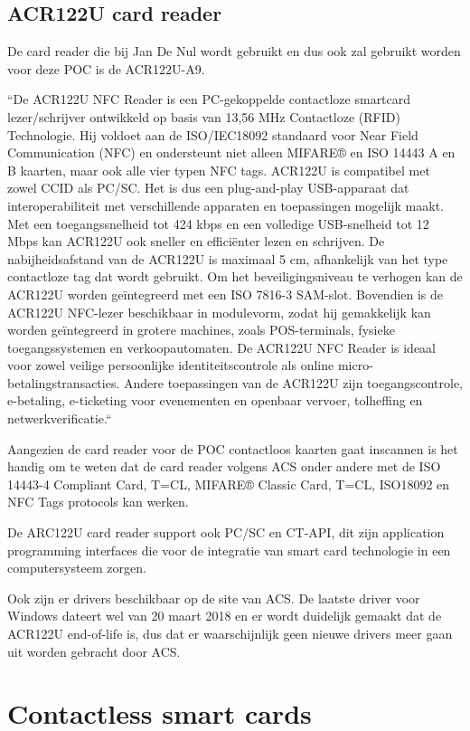 \subsection{ACR122U card reader}
De card reader die bij Jan De Nul wordt gebruikt en dus ook zal gebruikt worden voor deze POC is de ACR122U-A9.

``De ACR122U NFC Reader is een PC-gekoppelde contactloze smartcard lezer/schrijver ontwikkeld op basis van 13,56 MHz Contactloze (RFID) Technologie. Hij voldoet aan de ISO/IEC18092 standaard voor Near Field Communication (NFC) en ondersteunt niet alleen MIFARE® en ISO 14443 A en B kaarten, maar ook alle vier typen NFC tags.
ACR122U is compatibel met zowel CCID als PC/SC. Het is dus een plug-and-play USB-apparaat dat interoperabiliteit met verschillende apparaten en toepassingen mogelijk maakt. Met een toegangssnelheid tot 424 kbps en een volledige USB-snelheid tot 12 Mbps kan ACR122U ook sneller en efficiënter lezen en schrijven. De nabijheidsafstand van de ACR122U is maximaal 5 cm, afhankelijk van het type contactloze tag dat wordt gebruikt.
Om het beveiligingsniveau te verhogen kan de ACR122U worden geïntegreerd met een ISO 7816-3 SAM-slot. Bovendien is de ACR122U NFC-lezer beschikbaar in modulevorm, zodat hij gemakkelijk kan worden geïntegreerd in grotere machines, zoals POS-terminals, fysieke toegangssystemen en verkoopautomaten.
De ACR122U NFC Reader is ideaal voor zowel veilige persoonlijke identiteitscontrole als online micro-betalingstransacties. Andere toepassingen van de ACR122U zijn toegangscontrole, e-betaling, e-ticketing voor evenementen en openbaar vervoer, tolheffing en netwerkverificatie.``

Aangezien de card reader voor de POC contactloos kaarten gaat inscannen is het handig om te weten dat de card reader volgens ACS onder andere met de ISO 14443-4 Compliant Card, T=CL, MIFARE® Classic Card, T=CL, ISO18092 en NFC Tags protocols kan werken.

De ARC122U card reader support ook PC/SC en CT-API, dit zijn application programming interfaces die voor de integratie van smart card technologie in een computersysteem zorgen.

Ook zijn er drivers beschikbaar op de site van ACS. De laatste driver voor Windows dateert wel van 20 maart 2018 en er wordt duidelijk gemaakt dat de ACR122U end-of-life is, dus dat er waarschijnlijk geen nieuwe drivers meer gaan uit worden gebracht door ACS.


\section{Contactless smart cards}
